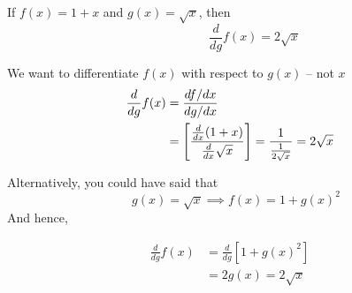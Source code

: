 \documentclass[14pt,fleqn]{extarticle}
\begin{document}
 
\begin{snippet}
    \correct
    If $f(x) = 1 + x$ and $g(x) = \sqrt{x}$, then 
    \[ \qquad\qquad  \frac{d}{dg}f(x) = 2\sqrt{x} \]
    
    
    \reason
    
    We want to differentiate $f(x)$ with respect to $g(x)$ -- not $x$
    \begin{align}
	\frac{d}{dg} f(x) &= \frac{df / dx}{dg / dx} \\ 
	&= \left[\frac{\frac{d}{dx} (1+x) }{\frac{d}{dx} \sqrt{x}} \right] = \frac{1}{\frac{1}{2\sqrt{x}}} = 2\sqrt{x} 
\end{align}

Alternatively, you could have said that 
\[ \quad g(x) = \sqrt{x} \implies f(x) = 1 + g(x)^2 \]
And hence, 

\begin{align}
	\frac{d}{dg}f(x) &= \frac{d}{dg} \left[1 + g(x)^2 \right] \\
	&= 2g(x) = 2\sqrt{x} 
\end{align}
    
\end{snippet} 
\end{document}
